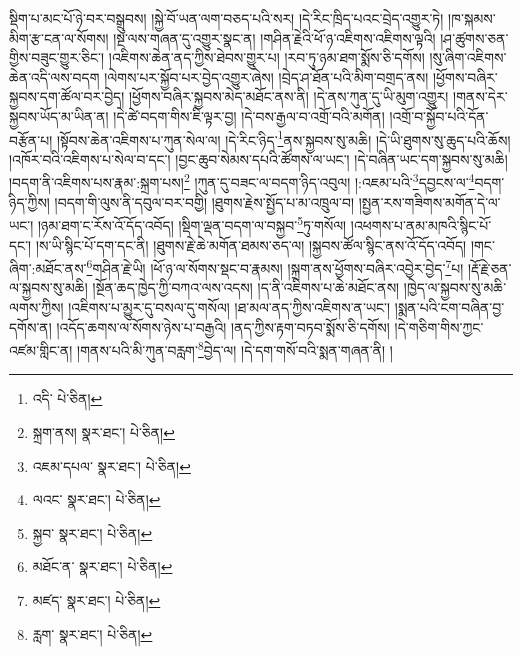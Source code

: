 སྡིག་པ་མང་པོ་ཉེ་བར་བསྒྲུབས། །སྐྱེ་བོ་ཡན་ལག་བཅད་པའི་སར། །དེ་རིང་ཁྲིད་པའང་བྲེད་འགྱུར་ཏེ། །ཁ་སྐམས་མིག་རྩ་ངན་ལ་སོགས། །སྔ་ལས་གཞན་དུ་འགྱུར་སྣང་ན། །གཤིན་རྗེའི་ཕོ་ཉ་འཇིགས་འཇིགས་ལྟའི། །ཤ་ཚུགས་ཅན་གྱིས་བཟུང་གྱུར་ཅིང་། །འཇིགས་ཆེན་ནད་ཀྱིས་ཐེབས་གྱུར་པ། །རབ་ཏུ་ཉམ་ཐག་སྨོས་ཅི་དགོས། །སུ་ཞིག་འཇིགས་ཆེན་འདི་ལས་བདག །ལེགས་པར་སྐྱོབ་པར་བྱེད་འགྱུར་ཞེས། །བྲེད་ཤ་ཐོན་པའི་མིག་བགྲད་ནས། །ཕྱོགས་བཞིར་སྐྱབས་དག་ཚོལ་བར་བྱེད། །ཕྱོགས་བཞིར་སྐྱབས་མེད་མཐོང་ནས་ནི། །དེ་ནས་ཀུན་དུ་ཡི་མུག་འགྱུར། །གནས་དེར་སྐྱབས་ཡོད་མ་ཡིན་ན། །དེ་ཚེ་བདག་གིས་ཇི་ལྟར་བྱ། །དེ་བས་རྒྱལ་བ་འགྲོ་བའི་མགོན། །འགྲོ་བ་སྐྱོབ་པའི་དོན་བརྩོན་པ། །སྟོབས་ཆེན་འཇིགས་པ་ཀུན་སེལ་ལ། །དེ་རིང་ཉིད་\footnote{འདི་  པེ་ཅིན། }ནས་སྐྱབས་སུ་མཆི། །དེ་ཡི་ཐུགས་སུ་ཆུད་པའི་ཆོས། །འཁོར་བའི་འཇིགས་པ་སེལ་བ་དང་། །བྱང་ཆུབ་སེམས་དཔའི་ཚོགས་ལ་ཡང་། །དེ་བཞིན་ཡང་དག་སྐྱབས་སུ་མཆི། །བདག་ནི་འཇིགས་པས་རྣམ་:སྐྲག་པས།\footnote{སྐྲག་ནས།  སྣར་ཐང་།  པེ་ཅིན། } །ཀུན་དུ་བཟང་ལ་བདག་ཉིད་འབུལ། །:འཇམ་པའི་\footnote{འཇམ་དཔལ་  སྣར་ཐང་།  པེ་ཅིན། }དབྱངས་ལ་\footnote{ལའང་  སྣར་ཐང་།  པེ་ཅིན། }བདག་ཉིད་ཀྱིས། །བདག་གི་ལུས་ནི་དབུལ་བར་བགྱི། །ཐུགས་རྗེས་སྤྱོད་པ་མ་འཁྲུལ་བ། །སྤྱན་རས་གཟིགས་མགོན་དེ་ལ་ཡང་། །ཉམ་ཐག་ང་རོས་འོ་དོད་འབོད། །སྡིག་ལྡན་བདག་ལ་བསྐྱབ་\footnote{སྐྱབ་  སྣར་ཐང་།  པེ་ཅིན། }ཏུ་གསོལ། །འཕགས་པ་ནམ་མཁའི་སྙིང་པོ་དང་། །ས་ཡི་སྙིང་པོ་དག་དང་ནི། །ཐུགས་རྗེ་ཆེ་མགོན་ཐམས་ཅད་ལ། །སྐྱབས་ཚོལ་སྙིང་ནས་འོ་དོད་འབོད། །གང་ཞིག་:མཐོང་ནས་\footnote{མཐོང་ན་  སྣར་ཐང་།  པེ་ཅིན། }གཤིན་རྗེ་ཡི། །ཕོ་ཉ་ལ་སོགས་སྡང་བ་རྣམས། །སྐྲག་ནས་ཕྱོགས་བཞིར་འབྱེར་བྱེད་\footnote{མཛད་  སྣར་ཐང་།  པེ་ཅིན། }པ། །རྡོ་རྗེ་ཅན་ལ་སྐྱབས་སུ་མཆི། །སྔོན་ཆད་ཁྱེད་ཀྱི་བཀའ་ལས་འདས། །ད་ནི་འཇིགས་པ་ཆེ་མཐོང་ནས། །ཁྱེད་ལ་སྐྱབས་སུ་མཆི་ལགས་ཀྱིས། །འཇིགས་པ་མྱུར་དུ་བསལ་དུ་གསོལ། །ཐ་མལ་ནད་ཀྱིས་འཇིགས་ན་ཡང་། །སྨན་པའི་ངག་བཞིན་བྱ་དགོས་ན། །འདོད་ཆགས་ལ་སོགས་ཉེས་པ་བརྒྱའི། །ནད་ཀྱིས་རྟག་བཏབ་སྨོས་ཅི་དགོས། །དེ་གཅིག་གིས་ཀྱང་འཛམ་གླིང་ན། །གནས་པའི་མི་ཀུན་བརླག་\footnote{རླག་  སྣར་ཐང་།  པེ་ཅིན། }བྱེད་ལ། །དེ་དག་གསོ་བའི་སྨན་གཞན་ནི། །
